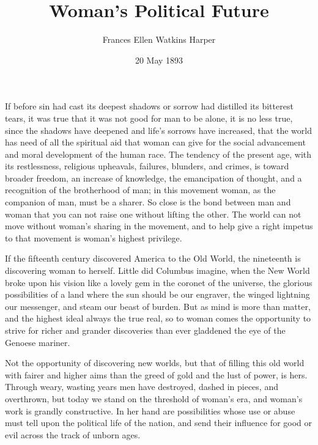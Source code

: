 \documentclass{article}
\title{Woman's Political Future}
\author{Frances Ellen Watkins Harper}
\date{20 May 1893}
\begin{document}
\maketitle

If before sin had cast its deepest shadows or sorrow had distilled its
bitterest tears, it was true that it was not good for man to be alone, it is no
less true, since the shadows have deepened and life’s sorrows have increased,
that the world has need of all the spiritual aid that woman can give for the
social advancement and moral development of the human race. The tendency of the
present age, with its restlessness, religious upheavals, failures, blunders,
and crimes, is toward broader freedom, an increase of knowledge, the
emancipation of thought, and a recognition of the brotherhood of man; in this
movement woman, as the companion of man, must be a sharer. So close is the bond
between man and woman that you can not raise one without lifting the other. The
world can not move without woman’s sharing in the movement, and to help give a
right impetus to that movement is woman’s highest privilege.

If the fifteenth century discovered America to the Old World, the nineteenth is
discovering woman to herself. Little did Columbus imagine, when the New World
broke upon his vision like a lovely gem in the coronet of the universe, the
glorious possibilities of a land where the sun should be our engraver, the
winged lightning our messenger, and steam our beast of burden. But as mind is
more than matter, and the highest ideal always the true real, so to woman comes
the opportunity to strive for richer and grander discoveries than ever
gladdened the eye of the Genoese mariner.

Not the opportunity of discovering new worlds, but that of filling this old
world with fairer and higher aims than the greed of gold and the lust of power,
is hers. Through weary, wasting years men have destroyed, dashed in pieces, and
overthrown, but today we stand on the threshold of woman’s era, and woman’s
work is grandly constructive. In her hand are possibilities whose use or abuse
must tell upon the political life of the nation, and send their influence for
good or evil across the track of unborn ages.
\end{document}
